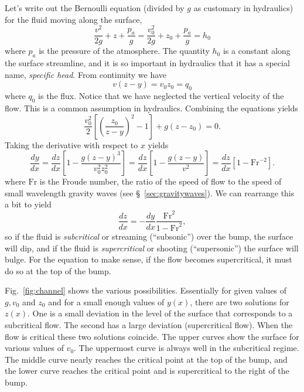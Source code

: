 {Let's write out the Bernoulli equation (divided by $g$ as customary in
hydraulics) for the fluid moving along the
surface,
\begin{equation}
\frac{v^2}{2g} + z + \frac{p_a}{g}= \frac{v_0^2}{2g} + z_0 +
\frac{p_a}{g} = h_0
\label{eq:669}
\end{equation}
where $p_a$ is the pressure of the atmosphere.  The quantity $h_0$ is
a constant along the surface streamline, and it is so important in
hydraulics that it has a special name, {\em specific head}.
From continuity we have
\begin{equation}
v \left ( z - y \right ) = v_0 z_0 = q_0
\label{eq:670}
\end{equation}
where $q_0$ is the flux.  Notice that we have neglected
the vertical velocity of the flow.  This is a common assumption in
hydraulics.  Combining the equations yields
\begin{equation}
\frac{v_0^2}{2} \left [ \left ( \frac{z_0}{z-y} \right )^2 - 1 \right
] + g \left (z-z_0\right) = 0 .
\label{eq:bern}
\label{eq:671}
\end{equation}
Taking the derivative with respect to $x$ yields
\begin{equation}
\frac{dy}{dx}=\frac{dz}{dx} \left [ 1 - \frac{g\left(z-y\right)^{3}}{v_0^2
      z_0^2} \right ] = \frac{dz}{dx} \left [ 1 -
    \frac{g\left(z-y\right)}{v^2} \right ] = 
\frac{dz}{dx} \left [ 1 - \mathrm{Fr}^{-2}\right ].
\label{eq:672}
\end{equation}
where $\mathrm{Fr}$ is the Froude number, the ratio of the speed of
flow to the speed of small wavelength gravity waves (see
\S~\ref{sec:gravitywaves}).  We can rearrange this a bit to yield
\begin{equation}
\frac{dz}{dx} = -\frac{dy}{dx} \frac{\mathrm{Fr}^2}{1-\mathrm{Fr}^2},
\label{eq:dzdx}
\label{eq:673}
\end{equation}
so if the fluid is {\em subcritical} or streaming (``subsonic'') over the bump, the surface will dip, and 
if the fluid is {\em supercritical} or shooting (``supersonic'') the surface will bulge.  For the
equation to make sense, if the flow becomes supercritical, it must do
so at the top of the bump.  

Fig.~\ref{fig:channel} shows the various possibilities.  Essentially
for given values of $g, v_0$ and $z_0$ and for a small enough values
of $y(x)$, there are two solutions for $z(x)$.  One is a small
deviation in the level of the surface that corresponds to a subcritical
flow.  The second has a large deviation (supercritical flow).  When the
flow is critical these two solutions coincide.  The upper curves show the
surface for various values of $v_0$.  The uppermost curve is always
well in the subcritical regime.  The middle curve nearly reaches the
critical point at the top of the bump, and the lower curve reaches the
critical point and is supercritical to the right of the bump.

}
